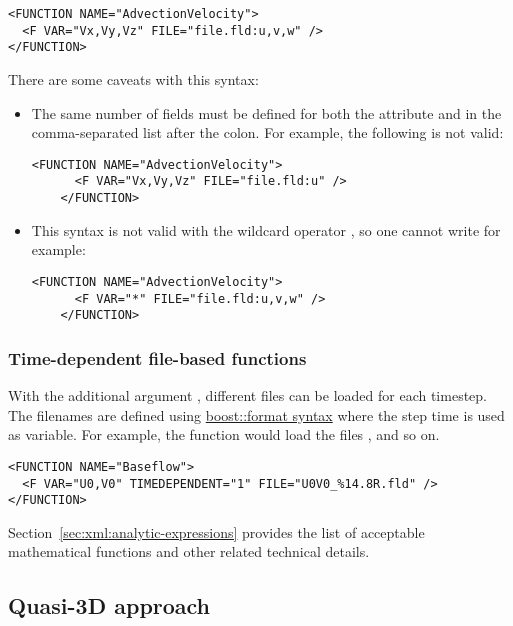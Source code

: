 \begin{lstlisting}[style=XMLStyle]
<FUNCTION NAME="AdvectionVelocity">
  <F VAR="Vx,Vy,Vz" FILE="file.fld:u,v,w" />
</FUNCTION>
\end{lstlisting}

There are some caveats with this syntax:

\begin{itemize}
  \item The same number of fields must be defined for both the 
  attribute and in the comma-separated list after the colon. For example, the
  following is not valid:
  \begin{lstlisting}[style=XMLStyle,gobble=4]
    <FUNCTION NAME="AdvectionVelocity">
      <F VAR="Vx,Vy,Vz" FILE="file.fld:u" />
    </FUNCTION>\end{lstlisting}
  \item This syntax is not valid with the wildcard operator \inltt{*}, so one
  cannot write for example:
  \begin{lstlisting}[style=XMLStyle,gobble=4]
    <FUNCTION NAME="AdvectionVelocity">
      <F VAR="*" FILE="file.fld:u,v,w" />
    </FUNCTION>
  \end{lstlisting}
\end{itemize}

\subsubsection{Time-dependent file-based functions}

With the additional argument , different files can be
loaded for each timestep. The filenames are defined using
\href{http://www.boost.org/doc/libs/1_56_0/libs/format/doc/format.html#syntax}{boost::format
  syntax} where the step time is used as variable. For example, the function
 would load the files ,
 and so on.

\begin{lstlisting}[style=XMLStyle]
<FUNCTION NAME="Baseflow">
  <F VAR="U0,V0" TIMEDEPENDENT="1" FILE="U0V0_%14.8R.fld" />
</FUNCTION>
\end{lstlisting}

Section~\ref{sec:xml:analytic-expressions} provides the list of acceptable
mathematical functions and other related technical details.

\subsection{Quasi-3D approach}

